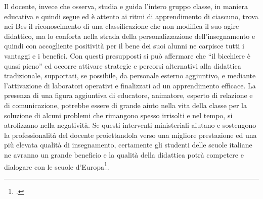 Il docente, invece che osserva, studia e guida l'intero gruppo classe, in maniera educativa e quindi segue ed è attento ai ritmi di apprendimento di ciascuno, trova nei Bes il riconoscimento di una classificazione che non modifica il suo agire didattico, ma lo conforta nella strada della personalizzazione dell'insegnamento e quindi con accogliente positività per il bene dei suoi alunni ne carpisce tutti i vantaggi e i benefici. Con questi presupposti si può affermare che “il bicchiere è quasi pieno” ed occorre attivare strategie e percorsi alternativi alla didattica tradizionale, supportati, se possibile, da personale esterno aggiuntivo, e mediante l'attivazione di laboratori operativi e finalizzati ad un apprendimento efficace.
La presenza di una figura aggiuntiva di educatore, animatore, esperto di relazione e di comunicazione, potrebbe essere di grande aiuto nella vita della classe per la soluzione di alcuni problemi che rimangono spesso irrisolti e nel tempo, si atrofizzano nella negatività.
Se questi interventi ministeriali aiutano e sostengono la professionalità del docente proiettandola verso una migliore prestazione ed una più elevata qualità di insegnamento, certamente gli studenti delle scuole italiane ne avranno un grande beneficio e la qualità della didattica potrà competere e dialogare con le scuole d'Europa\footcite{Aderno2007}.